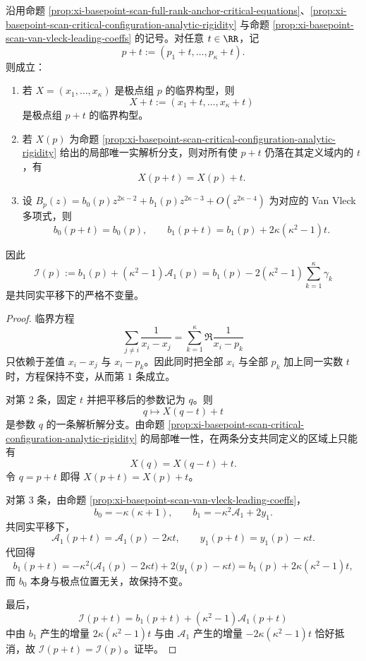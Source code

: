 \begin{theorem}\label{thm:xi-basepoint-scan-real-translation-b1-affine-transfer}
沿用命题 \ref{prop:xi-basepoint-scan-full-rank-anchor-critical-equations}、\ref{prop:xi-basepoint-scan-critical-configuration-analytic-rigidity} 与命题 \ref{prop:xi-basepoint-scan-van-vleck-leading-coeffs} 的记号。对任意 \(t\in\RR\)，记
\[
p+t:=(p_1+t,\dots,p_\kappa+t).
\]
则成立：
\begin{enumerate}
  \item 若 \(X=(x_1,\dots,x_\kappa)\) 是极点组 \(p\) 的临界构型，则
  \[
  X+t:=(x_1+t,\dots,x_\kappa+t)
  \]
  是极点组 \(p+t\) 的临界构型。
  \item 若 \(X(p)\) 为命题 \ref{prop:xi-basepoint-scan-critical-configuration-analytic-rigidity} 给出的局部唯一实解析分支，则对所有使 \(p+t\) 仍落在其定义域内的 \(t\)，有
  \[
  X(p+t)=X(p)+t.
  \]
  \item 设 \(B_p(z)=b_0(p)z^{2\kappa-2}+b_1(p)z^{2\kappa-3}+O(z^{2\kappa-4})\) 为对应的 Van Vleck 多项式，则
  \[
  b_0(p+t)=b_0(p),
  \qquad
  b_1(p+t)=b_1(p)+2\kappa(\kappa^2-1)t.
  \]
\end{enumerate}
因此
\[
\mathcal I(p)
:=
b_1(p)+(\kappa^2-1)\mathcal A_1(p)
=
b_1(p)-2(\kappa^2-1)\sum_{k=1}^{\kappa}\gamma_k
\]
是共同实平移下的严格不变量。
\end{theorem}
\begin{proof}
临界方程
\[
\sum_{j\ne i}\frac{1}{x_i-x_j}
=
\sum_{k=1}^{\kappa}\Re\frac{1}{x_i-p_k}
\]
只依赖于差值 \(x_i-x_j\) 与 \(x_i-p_k\)。因此同时把全部 \(x_i\) 与全部 \(p_k\) 加上同一实数 \(t\) 时，方程保持不变，从而第 \(1\) 条成立。

对第 \(2\) 条，固定 \(t\) 并把平移后的参数记为 \(q\)。则
\[
q\longmapsto X(q-t)+t
\]
是参数 \(q\) 的一条解析解分支。由命题 \ref{prop:xi-basepoint-scan-critical-configuration-analytic-rigidity} 的局部唯一性，在两条分支共同定义的区域上只能有
\[
X(q)=X(q-t)+t.
\]
令 \(q=p+t\) 即得
\(
X(p+t)=X(p)+t
\)。

对第 \(3\) 条，由命题 \ref{prop:xi-basepoint-scan-van-vleck-leading-coeffs}，
\[
b_0=-\kappa(\kappa+1),
\qquad
b_1=-\kappa^2\mathcal A_1+2y_1.
\]
共同实平移下，
\[
\mathcal A_1(p+t)=\mathcal A_1(p)-2\kappa t,
\qquad
y_1(p+t)=y_1(p)-\kappa t.
\]
代回得
\[
b_1(p+t)
=
-\kappa^2\bigl(\mathcal A_1(p)-2\kappa t\bigr)+2\bigl(y_1(p)-\kappa t\bigr)
=
b_1(p)+2\kappa(\kappa^2-1)t,
\]
而 \(b_0\) 本身与极点位置无关，故保持不变。

最后，
\[
\mathcal I(p+t)
=
b_1(p+t)+(\kappa^2-1)\mathcal A_1(p+t)
\]
中由 \(b_1\) 产生的增量 \(2\kappa(\kappa^2-1)t\) 与由 \(\mathcal A_1\) 产生的增量 \(-2\kappa(\kappa^2-1)t\) 恰好抵消，故 \(\mathcal I(p+t)=\mathcal I(p)\)。证毕。
\end{proof}

\endinput
